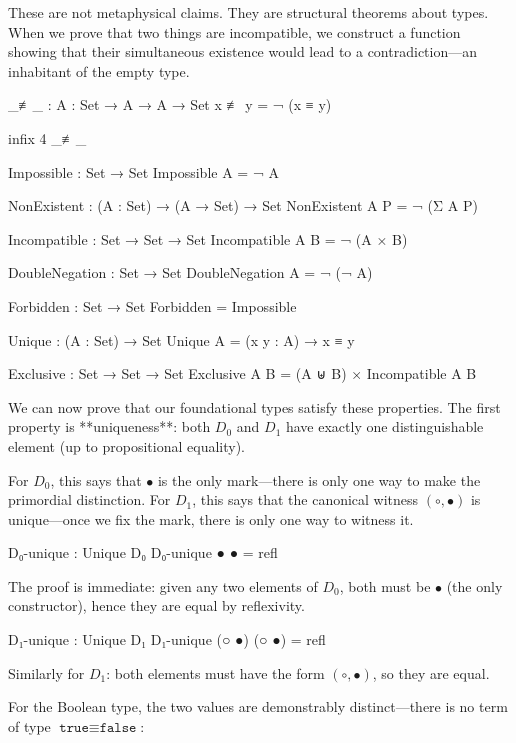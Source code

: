 \documentclass[11pt,a4paper]{book}
\begin{document}
These are not metaphysical claims. They are structural theorems about types. When we 
prove that two things are incompatible, we construct a function showing that their 
simultaneous existence would lead to a contradiction—an inhabitant of the empty type.

\begin{code}
_≢_ : {A : Set} → A → A → Set
x ≢ y = ¬ (x ≡ y)

infix 4 _≢_

Impossible : Set → Set
Impossible A = ¬ A

NonExistent : (A : Set) → (A → Set) → Set
NonExistent A P = ¬ (Σ A P)

Incompatible : Set → Set → Set
Incompatible A B = ¬ (A × B)

DoubleNegation : Set → Set
DoubleNegation A = ¬ (¬ A)
\end{code}

\begin{code}
Forbidden : Set → Set
Forbidden = Impossible

Unique : (A : Set) → Set
Unique A = (x y : A) → x ≡ y

Exclusive : Set → Set → Set
Exclusive A B = (A ⊎ B) × Incompatible A B
\end{code}

We can now prove that our foundational types satisfy these properties. 
The first property is **uniqueness**: both $D_0$ and $D_1$ have exactly one 
distinguishable element (up to propositional equality).

For $D_0$, this says that $\bullet$ is the only mark—there is only one way to make 
the primordial distinction. For $D_1$, this says that the canonical witness 
$(\circ, \bullet)$ is unique—once we fix the mark, there is only one way to witness it.

\begin{code}
D₀-unique : Unique D₀
D₀-unique ● ● = refl
\end{code}

The proof is immediate: given any two elements of $D_0$, both must be $\bullet$ 
(the only constructor), hence they are equal by reflexivity.

\begin{code}
D₁-unique : Unique D₁
D₁-unique (○ ●) (○ ●) = refl
\end{code}

Similarly for $D_1$: both elements must have the form $(\circ, \bullet)$, so they 
are equal.

For the Boolean type, the two values are demonstrably distinct—there is no term 
of type $\texttt{true} \equiv \texttt{false}$:
\end{document}
